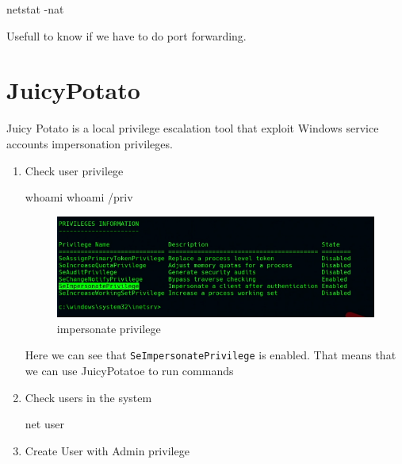 \documentclass{assets/ipesethesis}
\newenvironment{Shaded}{\begin{snugshade}}{\end{snugshade}}
\newcommand{\NormalTok}[1]{#1}
\begin{document}
\begin{Shaded}
\begin{Highlighting}[]
\NormalTok{netstat -nat}
\end{Highlighting}
\end{Shaded}

Usefull to know if we have to do port forwarding.

\hypertarget{juicypotato}{%
\section*{JuicyPotato}\label{juicypotato}}

Juicy Potato is a local privilege escalation tool that exploit Windows service accounts impersonation privileges.

\begin{enumerate}
\def\labelenumi{\arabic{enumi}.}
\item
  Check user privilege

\begin{Shaded}
\begin{Highlighting}[]
\NormalTok{whoami}
\NormalTok{whoami /priv}
\end{Highlighting}
\end{Shaded}

  \begin{figure}
   \includegraphics[width=0.9\linewidth]{images/juicy-impersonate-priv} \caption{impersonate privilege}\label{fig:unnamed-chunk-17}
   \end{figure}

  Here we can see that \texttt{SeImpersonatePrivilege} is enabled. That means that we can use JuicyPotatoe to run commands
\item
  Check users in the system

\begin{Shaded}
\begin{Highlighting}[]
\NormalTok{net user}
\end{Highlighting}
\end{Shaded}
\item
  Create User with Admin privilege


\end{enumerate}
\end{document}
